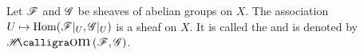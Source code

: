 \begin{definition}
    Let $\mathscr{F}$ and $\mathscr{G}$ be sheaves of abelian groups on $X$. The association $U\mapsto\operatorname{Hom}(\mathscr{F}|_U, \mathscr{G}|_U)$ is a sheaf on $X$. It is called the  and is denoted by $\sheafHom(\scrF, \scrG)$.
\end{definition}

\setcounter{exercise}{14}

\begin{exercise}
\end{exercise}
